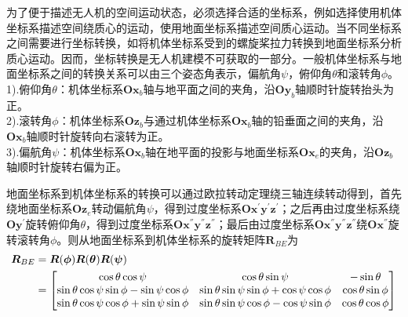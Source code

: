 为了便于描述无人机的空间运动状态，必须选择合适的坐标系，例如选择使用机体坐标系描述空间绕质心的运动，使用地面坐标系描述空间质心运动。当不同坐标系之间需要进行坐标转换，如将机体坐标系受到的螺旋桨拉力转换到地面坐标系分析质心运动。因而，坐标转换是无人机建模不可获取的一部分。一般机体坐标系与地面坐标系之间的转换关系可以由三个姿态角表示，偏航角$\psi$，俯仰角$\theta$和滚转角$\phi$。\\
1).俯仰角$\theta$：机体坐标系$\boldsymbol{O} \boldsymbol{x}_b$轴与地平面之间的夹角，沿$\boldsymbol{O} \boldsymbol{y}_b$轴顺时针旋转抬头为正。\\
2).滚转角$\phi$：机体坐标系$\boldsymbol{O} \boldsymbol{z}_b$与通过机体坐标系$\boldsymbol{O} \boldsymbol{x}_b$轴的铅垂面之间的夹角，沿$\boldsymbol{O} \boldsymbol{x}_b$轴顺时针旋转向右滚转为正。\\
3).偏航角$\psi$：机体坐标系$\boldsymbol{O} \boldsymbol{x}_b$轴在地平面的投影与地面坐标系$\boldsymbol{O} \boldsymbol{x}_e$的夹角，沿$\boldsymbol{O} \boldsymbol{z}_b$轴顺时针旋转右偏为正。

地面坐标系到机体坐标系的转换可以通过欧拉转动定理绕三轴连续转动得到，首先绕地面坐标系$\boldsymbol{O} \boldsymbol{z}_e$转动偏航角$\psi$，得到过度坐标系$\boldsymbol{O} \boldsymbol{x}^{'} \boldsymbol{y}^{'} \boldsymbol{z}^{'}$；之后再由过度坐标系绕$\boldsymbol{O} \boldsymbol{y}^{'}$旋转俯仰角$\theta$，得到过度坐标系$\boldsymbol{O} \boldsymbol{x}^{''} \boldsymbol{y}^{''} \boldsymbol{z}^{''}$；最后由过度坐标系$\boldsymbol{O} \boldsymbol{x}^{''} \boldsymbol{y}^{''} \boldsymbol{z}^{''}$绕$\boldsymbol{O} \boldsymbol{x}^{''}$旋转滚转角$\phi$。则从地面坐标系到机体坐标系的旋转矩阵$\boldsymbol{R}_{BE}$为
\begin{equation}
\label{equ2.1}
\begin{aligned}
\boldsymbol{R}_{BE} 
&= \boldsymbol{R}(\boldsymbol{\phi}) \boldsymbol{R}(\boldsymbol{\theta}) \boldsymbol{R}(\boldsymbol{\psi}) \\ 
&= 
\begin{bmatrix}
\cos\theta \cos\psi & \cos\theta \sin\psi & -\sin\theta \cr
\sin\theta \cos\psi \sin\phi - \sin\psi \cos\phi & \sin\theta \sin\psi \sin\phi + \cos\psi \cos\phi & \cos\theta \sin\phi \cr
\sin\theta \cos\psi \cos\phi + \sin\psi \sin\phi & \sin\theta \sin\psi \cos\phi - \cos\psi \sin\phi & \cos\theta \cos\phi \cr
\end{bmatrix}
\end{aligned}
\end{equation}

